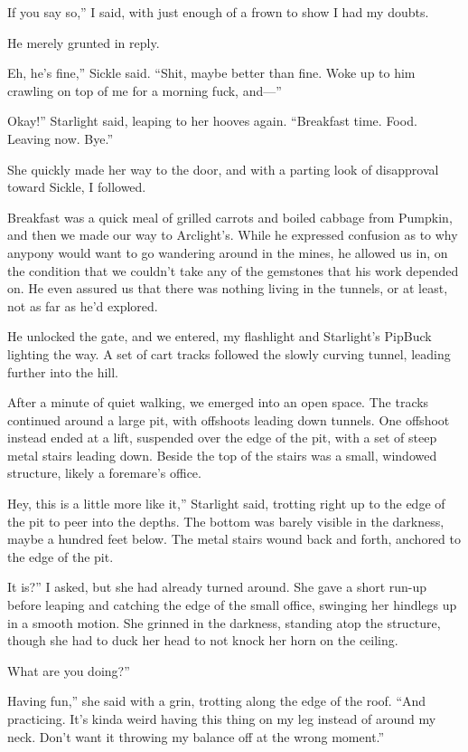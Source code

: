 \leavevmode{}If you say so,” I said, with just enough of a frown to show I had my doubts.

He merely grunted in reply.

\leavevmode{}Eh, he’s fine,” Sickle said. “Shit, maybe better than fine. Woke up to him crawling on top of me for a morning fuck, and—”

\leavevmode{}Okay!” Starlight said, leaping to her hooves again. “Breakfast time. Food. Leaving now. Bye.”

She quickly made her way to the door, and with a parting look of disapproval toward Sickle, I followed.

Breakfast was a quick meal of grilled carrots and boiled cabbage from Pumpkin, and then we made our way to Arclight’s. While he expressed confusion as to why anypony would want to go wandering around in the mines, he allowed us in, on the condition that we couldn’t take any of the gemstones that his work depended on. He even assured us that there was nothing living in the tunnels, or at least, not as far as he’d explored.

He unlocked the gate, and we entered, my flashlight and Starlight’s PipBuck lighting the way. A set of cart tracks followed the slowly curving tunnel, leading further into the hill.

After a minute of quiet walking, we emerged into an open space. The tracks continued around a large pit, with offshoots leading down tunnels. One offshoot instead ended at a lift, suspended over the edge of the pit, with a set of steep metal stairs leading down. Beside the top of the stairs was a small, windowed structure, likely a foremare’s office.

\leavevmode{}Hey, this is a little more like it,” Starlight said, trotting right up to the edge of the pit to peer into the depths. The bottom was barely visible in the darkness, maybe a hundred feet below. The metal stairs wound back and forth, anchored to the edge of the pit.

\leavevmode{}It is?” I asked, but she had already turned around. She gave a short run-up before leaping and catching the edge of the small office, swinging her hindlegs up in a smooth motion. She grinned in the darkness, standing atop the structure, though she had to duck her head to not knock her horn on the ceiling.

\leavevmode{}What are you doing?”

\leavevmode{}Having fun,” she said with a grin, trotting along the edge of the roof. “And practicing. It’s kinda weird having this thing on my leg instead of around my neck. Don’t want it throwing my balance off at the wrong moment.”

